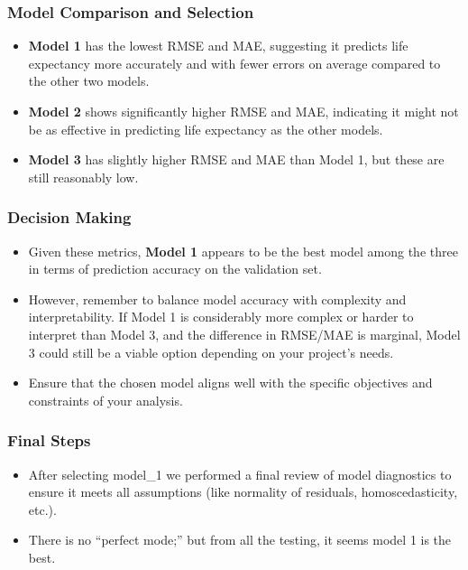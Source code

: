 \documentclass[
]{article}
\providecommand{\tightlist}{%
  \setlength{\itemsep}{0pt}\setlength{\parskip}{0pt}}
\begin{document}
\hypertarget{model-comparison-and-selection}{%
\subsubsection{Model Comparison and
Selection}\label{model-comparison-and-selection}}

\begin{itemize}
\tightlist
\item
  \textbf{Model 1} has the lowest RMSE and MAE, suggesting it predicts
  life expectancy more accurately and with fewer errors on average
  compared to the other two models.
\item
  \textbf{Model 2} shows significantly higher RMSE and MAE, indicating
  it might not be as effective in predicting life expectancy as the
  other models.
\item
  \textbf{Model 3} has slightly higher RMSE and MAE than Model 1, but
  these are still reasonably low.
\end{itemize}

\hypertarget{decision-making}{%
\subsubsection{Decision Making}\label{decision-making}}

\begin{itemize}
\tightlist
\item
  Given these metrics, \textbf{Model 1} appears to be the best model
  among the three in terms of prediction accuracy on the validation set.
\item
  However, remember to balance model accuracy with complexity and
  interpretability. If Model 1 is considerably more complex or harder to
  interpret than Model 3, and the difference in RMSE/MAE is marginal,
  Model 3 could still be a viable option depending on your project's
  needs.
\item
  Ensure that the chosen model aligns well with the specific objectives
  and constraints of your analysis.
\end{itemize}

\hypertarget{final-steps}{%
\subsubsection{Final Steps}\label{final-steps}}

\begin{itemize}
\tightlist
\item
  After selecting model\_1 we performed a final review of model
  diagnostics to ensure it meets all assumptions (like normality of
  residuals, homoscedasticity, etc.).
\item
  There is no ``perfect mode;'' but from all the testing, it seems model
  1 is the best.
\end{itemize}
\end{document}
